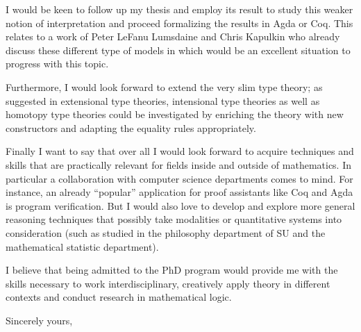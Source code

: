 \documentclass[11pt]{letter} %
\begin{document}
\begin{letter}
	I would be keen to follow up my thesis and employ its result to study this weaker notion of interpretation and proceed formalizing the results in Agda or Coq. This relates to a work of Peter LeFanu Lumsdaine and Chris Kapulkin who already discuss these different type of models in \cite{lumsdainehomotopy} which would be an excellent situation to progress with this topic.

	Furthermore, I would look forward to extend the very slim type theory; as suggested in \cite{curien-garner-hofmann} extensional type theories, intensional type theories as well as homotopy type theories could be investigated by enriching the theory with new constructors and adapting the equality rules appropriately. 

Finally I want to say that over all I would look forward to acquire techniques and skills that are practically relevant for fields inside and outside of mathematics. 
In particular a collaboration with computer science departments comes to mind. For instance, an already ``popular'' application for proof assistants like Coq and Agda is program verification. But I would also love to develop and explore more general reasoning techniques that possibly take modalities or quantitative systems into consideration (such as studied in the philosophy department of SU and the mathematical statistic department).

I believe that being admitted to the PhD program would provide me with the skills necessary to work interdisciplinary, creatively apply theory in different contexts and conduct research in mathematical logic. 


\closing{Sincerely yours,}





\end{letter}
\end{document}
